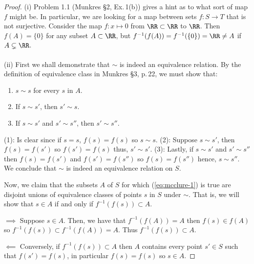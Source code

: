 \begin{proof}
(i) Problem 1.1 (Munkres \S2, Ex.\,1(b)) gives a hint as to what
sort of map $f$ might be. In particular, we are looking for a map
between sets $f\colon S\to T$ that is not surjective. Consider
the map $f\colon x\mapsto 0$ from $\RR\subset\RR$ to $\RR$. Then
$f(A)=\{0\}$ for any subset $A\subset\RR$, but
$f^{-1}(f(A))=f^{-1}(\{0\})=\RR\neq A$ if $A\subsetneq\RR$.
\\\\
(ii) First we shall demonstrate that $\sim$ is indeed an
equivalence relation. By the definition of equivalence class in
Munkres \S3, p.\,22, we must show that:
\begin{enumerate}[noitemsep,label=(\arabic*)]
\item $s\sim s$ for every $s$ in $A$.
\item If $s\sim s'$, then $s'\sim s$.
\item If $s\sim s'$ and $s'\sim s''$, then $s'\sim s''$.
\end{enumerate}
(1): Is clear since if $s=s$, $f(s)=f(s)$ so $s\sim s$. (2):
Suppose $s\sim s'$, then $f(s)=f(s')$ so $f(s')=f(s)$ thus,
$s'\sim s'$. (3): Lastly, if $s\sim s'$ and $s'\sim s''$ then
$f(s)=f(s')$ and $f(s')=f(s'')$ so $f(s)=f(s'')$ hence, $s\sim
s''$. We conclude that $\sim$ is indeed an equivalence relation
on $S$.

Now, we claim that the subsets $A$ of $S$ for which
(\ref{eq:mcclure-1}) is true are disjoint unions of equivalence
classes of points $s$ in $S$ under $\sim$. That is, we will show
that $s\in A$ if and only if $f^{-1}(f(s))\subset A$.

$\implies$ Suppose $s\in A$. Then, we have that $f^{-1}(f(A))=A$
then $f(s)\in f(A)$ so $f^{-1}(f(s))\subset f^{-1}(f(A))=A$. Thus
$f^{-1}(f(s))\subset A$.

$\impliedby$ Conversely, if $f^{-1}(f(s))\subset A$ then $A$
contains every point $s'\in S$ such that $f(s')=f(s)$, in
particular $f(s)=f(s)$ so $s\in A$.
\end{proof}

